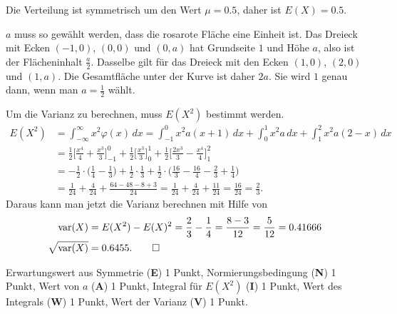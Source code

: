 \begin{loesung}
\begin{teilaufgaben}
\item Die Verteilung ist symmetrisch um den Wert $\mu=0.5$,
daher ist $E(X)=0.5$.
\item $a$ muss so gewählt werden, dass die rosarote Fläche eine Einheit ist.
Das Dreieck mit Ecken $(-1,0)$, $(0,0)$ und $(0,a)$ hat Grundseite $1$ und
Höhe $a$, also ist der Flächeninhalt $\frac{a}2$.
Dasselbe gilt für das Dreieck mit den Ecken $(1,0)$, $(2,0)$ und $(1,a)$.
Die Gesamtfläche unter der Kurve ist daher $2a$.
Sie wird $1$ genau dann, wenn man $a=\frac12$ wählt.
\item
Um die Varianz zu berechnen, muss $E(X^2)$ bestimmt werden.
\begin{align*}
E(X^2)
&=
\int_{-\infty}^\infty x^2 \varphi(x)\,dx
=
\int_{-1}^0 x^2 a(x+1)\,dx
+
\int_0^1 x^2a\,dx
+
\int_1^2 x^2a(2-x)\,dx
\\
&=
\frac12\biggl[
\frac{x^4}4+\frac{x^3}3
\biggr]_{-1}^0
+
\frac12\biggl[
\frac{x^3}3
\biggr]_{0}^1
+
\frac12\biggl[
\frac{2x^3}3
-
\frac{x^4}4
\biggr]_{1}^2
\\
&=
-\frac12\cdot\biggl(\frac14-\frac13\biggr)
+
\frac12\cdot\frac13
+
\frac12\cdot\biggl(\frac{16}3-\frac{16}4-\frac23+\frac14\biggr)
\\
&=
\frac1{24}
+\frac4{24}
+\frac{64-48-8+3}{24}
=
\frac1{24}
+\frac4{24}
+\frac{11}{24}
=
\frac{16}{24}
=
\frac{2}{3}.
\end{align*}
Daraus kann man jetzt die Varianz berechnen mit Hilfe von
\begin{align*}
\operatorname{var}(X)
&=
E(X^2) - E(X)^2
=
\frac{2}{3} - \frac{1}{4}
=
\frac{8-3}{12}=\frac{5}{12}=0.41666
\\
\sqrt{\operatorname{var}(X)}
&=
0.6455.
\qedhere
\end{align*}
\end{teilaufgaben}
\end{loesung}

\begin{bewertung}
Erwartungswert aus Symmetrie ({\bf E}) 1 Punkt,
Normierungsbedingung ({\bf N}) 1 Punkt,
Wert von $a$ ({\bf A}) 1 Punkt,
Integral für $E(X^2)$ ({\bf I}) 1 Punkt,
Wert des Integrals ({\bf W}) 1 Punkt,
Wert der Varianz ({\bf V}) 1 Punkt.
\end{bewertung}

